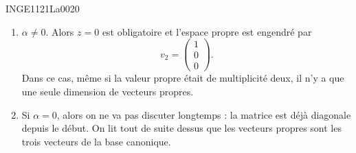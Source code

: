 \begin{corrige}{INGE1121La0020}
\begin{enumerate}
		\item
			$\alpha\neq 0$. Alors $z=0$ est obligatoire et l'espace propre est engendré par
			\begin{equation}
				v_{2}=\begin{pmatrix}
					1	\\ 
					0	\\ 
					0	
				\end{pmatrix}.
			\end{equation}
			Dans ce cas, même si la valeur propre était de multiplicité deux, il n'y a que une seule dimension de vecteurs propres.
		\item
			Si $\alpha=0$, alors on ne va pas discuter longtemps : la matrice est déjà diagonale depuis le début. On lit tout de suite dessus que les vecteurs propres sont les trois vecteurs de la base canonique.

	\end{enumerate}
	
\end{corrige}
